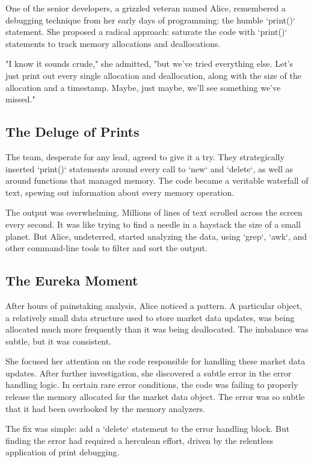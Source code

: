 \documentclass{article}
\begin{document}
{{{{One of the senior developers, a grizzled veteran named Alice, remembered a debugging technique from her early days of programming: the humble `print()` statement. She proposed a radical approach: saturate the code with `print()` statements to track memory allocations and deallocations.

"I know it sounds crude," she admitted, "but we've tried everything else. Let's just print out every single allocation and deallocation, along with the size of the allocation and a timestamp. Maybe, just maybe, we'll see something we've missed."

\subsection*{The Deluge of Prints}

The team, desperate for any lead, agreed to give it a try. They strategically inserted `print()` statements around every call to `new` and `delete`, as well as around functions that managed memory. The code became a veritable waterfall of text, spewing out information about every memory operation.

The output was overwhelming. Millions of lines of text scrolled across the screen every second. It was like trying to find a needle in a haystack the size of a small planet. But Alice, undeterred, started analyzing the data, using `grep`, `awk`, and other command-line tools to filter and sort the output.

\subsection*{The Eureka Moment}

After hours of painstaking analysis, Alice noticed a pattern. A particular object, a relatively small data structure used to store market data updates, was being allocated much more frequently than it was being deallocated. The imbalance was subtle, but it was consistent.

She focused her attention on the code responsible for handling these market data updates. After further investigation, she discovered a subtle error in the error handling logic. In certain rare error conditions, the code was failing to properly release the memory allocated for the market data object. The error was so subtle that it had been overlooked by the memory analyzers.

The fix was simple: add a `delete` statement to the error handling block. But finding the error had required a herculean effort, driven by the relentless application of print debugging.

}}}}
\end{document}
